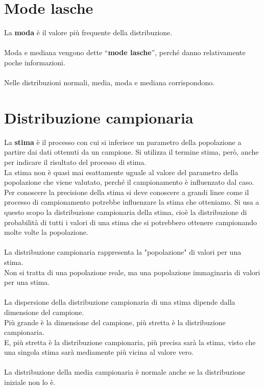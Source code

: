 \documentclass[10pt, draft]{book}
\begin{document}
\section{Mode lasche}
La \textbf{moda} è il valore più frequente della distribuzione.
\\
\\
Moda e mediana vengono dette “\textbf{mode lasche}”, perché danno relativamente poche informazioni.
\\
\\
Nelle distribuzioni normali, media, moda e mediana corrispondono.

\section{Distribuzione campionaria}
La \textbf{stima} è il processo con cui si inferisce un parametro della popolazione a partire dai dati ottenuti da un campione. Si utilizza il termine stima, però, anche per indicare il risultato del processo di stima.
\\
La stima non è quasi mai esattamente uguale al valore del parametro della popolazione che viene valutato, perché il campionamento è influenzato dal caso.
\\
Per conoscere la precisione della stima si deve conoscere a grandi linee come il processo di campionamento potrebbe influenzare la stima che otteniamo. Si usa a questo scopo la distribuzione campionaria della stima, cioè la distribuzione di probabilità di tutti i valori di una stima che si potrebbero ottenere campionando molte volte la popolazione.
\\
\\
La distribuzione campionaria rappresenta la "popolazione" di valori per una stima. 
\\
Non si tratta di una popolazione reale, ma una popolazione immaginaria di valori per una stima.
\\
\\
La dispersione della distribuzione campionaria di una stima dipende dalla dimensione del campione. 
\\
Più grande è la dimensione del campione, più stretta è la distribuzione campionaria. 
\\
E, più stretta è la distribuzione campionaria, più precisa sarà la stima, visto che una singola stima sarà mediamente più vicina al valore vero.
\\
\\
La distribuzione della media campionaria è normale anche se la distribuzione iniziale non lo è.
\end{document}
